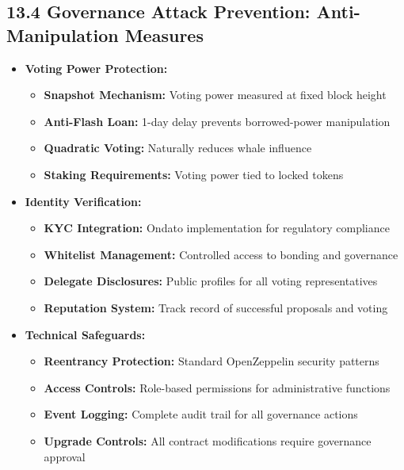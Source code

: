 \documentclass[
  paper=a4,
  ,captions=tableheading
]{scrartcl}
\providecommand{\tightlist}{%
  \setlength{\itemsep}{0pt}\setlength{\parskip}{0pt}}
\begin{document}
\subsection{13.4 Governance Attack Prevention: Anti-Manipulation
Measures}\label{governance-attack-prevention-anti-manipulation-measures}

\begin{itemize}
\tightlist
\item
  \textbf{Voting Power Protection:}

  \begin{itemize}
  \tightlist
  \item
    \textbf{Snapshot Mechanism:} Voting power measured at fixed block
    height
  \item
    \textbf{Anti-Flash Loan:} 1-day delay prevents borrowed-power
    manipulation
  \item
    \textbf{Quadratic Voting:} Naturally reduces whale influence
  \item
    \textbf{Staking Requirements:} Voting power tied to locked tokens
  \end{itemize}
\item
  \textbf{Identity Verification:}

  \begin{itemize}
  \tightlist
  \item
    \textbf{KYC Integration:} Ondato implementation for regulatory
    compliance
  \item
    \textbf{Whitelist Management:} Controlled access to bonding and
    governance
  \item
    \textbf{Delegate Disclosures:} Public profiles for all voting
    representatives
  \item
    \textbf{Reputation System:} Track record of successful proposals and
    voting
  \end{itemize}
\item
  \textbf{Technical Safeguards:}

  \begin{itemize}
  \tightlist
  \item
    \textbf{Reentrancy Protection:} Standard OpenZeppelin security
    patterns
  \item
    \textbf{Access Controls:} Role-based permissions for administrative
    functions
  \item
    \textbf{Event Logging:} Complete audit trail for all governance
    actions
  \item
    \textbf{Upgrade Controls:} All contract modifications require
    governance approval
  \end{itemize}
\end{itemize}
\end{document}
